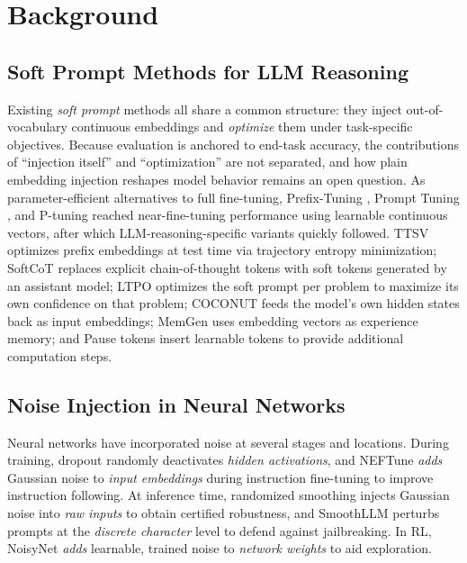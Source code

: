 
\section{Background}\label{sec:background}

\subsection{Soft Prompt Methods for LLM Reasoning}\label{sec:rw_soft_prompt}

Existing \textit{soft prompt} methods all share a common structure: they inject out-of-vocabulary continuous embeddings and \emph{optimize} them under task-specific objectives. Because evaluation is anchored to end-task accuracy, the contributions of ``injection itself'' and ``optimization'' are not separated, and how plain embedding injection reshapes model behavior remains an open question. As parameter-efficient alternatives to full fine-tuning, Prefix-Tuning \citep{li2021prefix}, Prompt Tuning \citep{lester2021power}, and P-tuning \citep{liu2021gpt} reached near-fine-tuning performance using learnable continuous vectors, after which LLM-reasoning-specific variants quickly followed. TTSV \citep{kang2025model} optimizes prefix embeddings at test time via trajectory entropy minimization; SoftCoT \citep{xu2025softcot} replaces explicit chain-of-thought tokens with soft tokens generated by an assistant model; LTPO \citep{ye2025thinking} optimizes the soft prompt per problem to maximize its own confidence on that problem; COCONUT \citep{hao2024training} feeds the model's own hidden states back as input embeddings; MemGen \citep{zhang2025memgen} uses embedding vectors as experience memory; and Pause tokens \citep{goyal2024think} insert learnable tokens to provide additional computation steps.

\subsection{Noise Injection in Neural Networks}\label{sec:rw_perturbation}

Neural networks have incorporated noise at several stages and locations. During training, dropout \citep{srivastava2014dropout} randomly deactivates \textit{hidden activations}, and NEFTune \citep{jain2024neftune} \textit{adds} Gaussian noise to \textit{input embeddings} during instruction fine-tuning to improve instruction following. At inference time, randomized smoothing \citep{cohen2019certified} injects Gaussian noise into \textit{raw inputs} to obtain certified robustness, and SmoothLLM \citep{robey2023smoothllm} perturbs prompts at the \textit{discrete character} level to defend against jailbreaking. In RL, NoisyNet \citep{fortunato2018noisy} \textit{adds} learnable, trained noise to \textit{network weights} to aid exploration.

